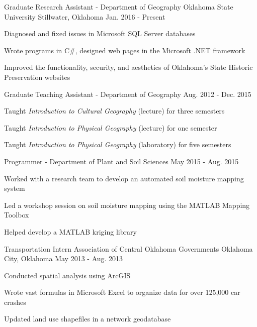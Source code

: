 \begin{cventries}
  \cventry
    {Graduate Research Assistant - Department of Geography}
    {Oklahoma State University}
    {Stillwater, Oklahoma}
    {Jan. 2016 - Present}
    {
      \begin{expitems}
        \item {Diagnosed and fixed issues in Microsoft SQL Server databases}
        \item {Wrote programs in C\#, designed web pages in the Microsoft .NET framework}
        \item {Improved the functionality, security, and aesthetics of
            Oklahoma's State Historic Preservation websites}
      \end{expitems}
    }

  \cventry
    {Graduate Teaching Assistant - Department of Geography}
    {}
    {}
    {Aug. 2012 - Dec. 2015}
    {
      \begin{expitems}
      \item {Taught \textit{Introduction to Cultural Geography} (lecture) for three
          semesters}
      \item {Taught \textit{Introduction to Physical Geography} (lecture) for one
          semester}
      \item {Taught \textit{Introduction to Physical Geography} (laboratory) for five
          semesters}
      \end{expitems}
    }

  \cventry
    {Programmer - Department of Plant and Soil Sciences}
    {}
    {}
    {May 2015 - Aug. 2015}
    {
      \begin{expitems}
      \item {Worked with a research team to develop an automated soil moisture
          mapping system}
        \item {Led a workshop session on soil moisture mapping using the MATLAB
            Mapping Toolbox}
        \item {Helped develop a MATLAB kriging library}
      \end{expitems}
    }

  \cventry
    {Transportation Intern}
    {Association of Central Oklahoma Governments}
    {Oklahoma City, Oklahoma}
    {May 2013 - Aug. 2013}
    {
      \begin{expitems}
        \item {Conducted spatial analysis using ArcGIS}
        \item {Wrote vast formulas in Microsoft Excel to organize data for over 125,000 car crashes}
        \item {Updated land use shapefiles in a network geodatabase}
      \end{expitems}
    }


\end{cventries}
